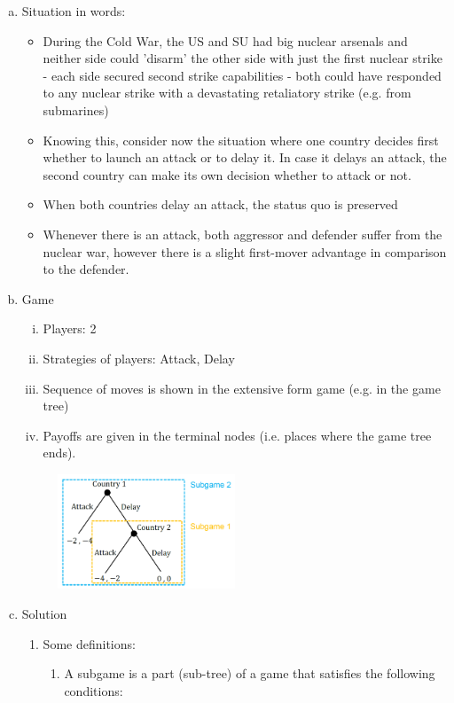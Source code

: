 \begin{enumerate}[a)]
    \item Situation in words:
        \begin{itemize}
            \item During the Cold War, the US and SU had big nuclear
                arsenals and neither side could 'disarm' the other side with
                just the first nuclear strike - each side secured second strike
                capabilities - both could have responded to any nuclear strike
                with a devastating retaliatory strike (e.g. from submarines)
            \item Knowing this, consider now the situation where one country
                decides first whether to launch an attack or to delay it. In case
                it delays an attack, the second country can make its own decision
                whether to attack or not.
            \item When both countries delay an attack, the status quo is preserved
            \item Whenever there is an attack, both aggressor and defender suffer
                from the nuclear war, however there is a slight first-mover advantage
                in comparison to the defender.
        \end{itemize}
    \item Game
        \begin{enumerate}[(i)]
            \item Players: 2
            \item Strategies of players: Attack, Delay
            \item Sequence of moves is shown in the extensive form game
                (e.g. in the game tree)
            \item Payoffs are given in the terminal nodes (i.e. places where the game
                tree ends).
        \end{enumerate}
        \begin{figure}[H]
            \centering
            \includegraphics[width=0.5\textwidth]{Pictures/nuclear_example_1.png}
        \end{figure}
    \item Solution
        \begin{enumerate}[c1)]
            \item Some definitions:
                \begin{enumerate}[(1)]
                    \item A subgame is a part (sub-tree) of a game that satisfies
                        the following conditions:


\end{enumerate}
\end{enumerate}
\end{enumerate}

